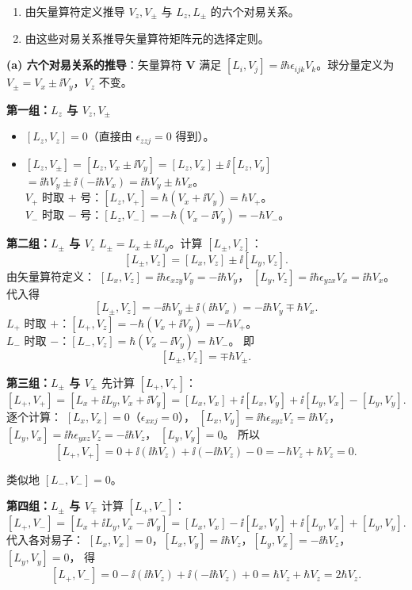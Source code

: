 \begin{question}
\begin{enumerate}
\item 由矢量算符定义推导 $V_z,V_\pm$ 与 $L_z,L_\pm$ 的六个对易关系。
\item 由这些对易关系推导矢量算符矩阵元的选择定则。
\end{enumerate}
\end{question}
\begin{solution}
	\textbf{(a) 六个对易关系的推导}：矢量算符 $\mathbf V$ 满足 $[L_i,V_j]=\ii\hbar\epsilon_{ijk}V_k$。球分量定义为 $V_\pm=V_x\pm\ii V_y$，$V_z$ 不变。

	\textbf{第一组：$L_z$ 与 $V_z,V_\pm$}
	\begin{itemize}
	\item $[L_z,V_z]=0$（直接由 $\epsilon_{zzj}=0$ 得到）。
	\item $[L_z,V_\pm] = [L_z,V_x\pm\ii V_y] = [L_z,V_x]\pm\ii[L_z,V_y]$\\
	$= \ii\hbar V_y \pm\ii(-\ii\hbar V_x) = \ii\hbar V_y\pm\hbar V_x$。\\
	$V_+$ 时取 $+$ 号：$[L_z,V_+]=\hbar(V_x+\ii V_y)=\hbar V_+$。\\
	$V_-$ 时取 $-$ 号：$[L_z,V_-]=-\hbar(V_x-\ii V_y)=-\hbar V_-$。
	\end{itemize}

	\textbf{第二组：$L_\pm$ 与 $V_z$}
	$L_\pm = L_x\pm\ii L_y$。计算 $[L_\pm,V_z]$：
	\[
	[L_\pm,V_z] = [L_x,V_z]\pm\ii[L_y,V_z].
	\]
	由矢量算符定义：
	$[L_x,V_z]=\ii\hbar\epsilon_{xzy}V_y = -\ii\hbar V_y$，
	$[L_y,V_z]=\ii\hbar\epsilon_{yzx}V_x = \ii\hbar V_x$。
	代入得
	\[
	[L_\pm,V_z] = -\ii\hbar V_y \pm\ii(\ii\hbar V_x) = -\ii\hbar V_y \mp\hbar V_x.
	\]
	$L_+$ 时取 $+$：$[L_+,V_z] = -\hbar(V_x+\ii V_y) = -\hbar V_+$。\\
	$L_-$ 时取 $-$：$[L_-,V_z] = \hbar(V_x-\ii V_y) = \hbar V_-$。
	即
	\[
	[L_\pm,V_z] = \mp\hbar V_\pm.
	\]

	\textbf{第三组：$L_\pm$ 与 $V_\pm$} 先计算 $[L_+,V_+]$：
	\[
	[L_+,V_+] = [L_x+\ii L_y, V_x+\ii V_y]
	= [L_x,V_x] + \ii[L_x,V_y] + \ii[L_y,V_x] - [L_y,V_y].
	\]
	逐个计算：
	$[L_x,V_x]=0$（$\epsilon_{xxj}=0$），
	$[L_x,V_y]=\ii\hbar\epsilon_{xyz}V_z = \ii\hbar V_z$，
	$[L_y,V_x]=\ii\hbar\epsilon_{yxz}V_z = -\ii\hbar V_z$，
	$[L_y,V_y]=0$。
	所以
	\[
	[L_+,V_+] = 0 + \ii(\ii\hbar V_z) + \ii(-\ii\hbar V_z) - 0 = -\hbar V_z + \hbar V_z = 0.
	\]

	类似地 $[L_-,V_-]=0$。

	\textbf{第四组：$L_\pm$ 与 $V_\mp$} 计算 $[L_+,V_-]$：
	\[
	[L_+,V_-] = [L_x+\ii L_y, V_x-\ii V_y]
	= [L_x,V_x] -\ii[L_x,V_y] +\ii[L_y,V_x] + [L_y,V_y].
	\]
	代入各对易子：
	$[L_x,V_x]=0$，$[L_x,V_y]=\ii\hbar V_z$，$[L_y,V_x]=-\ii\hbar V_z$，$[L_y,V_y]=0$，
	得
	\[
	[L_+,V_-] = 0 - \ii(\ii\hbar V_z) + \ii(-\ii\hbar V_z) + 0 = \hbar V_z + \hbar V_z = 2\hbar V_z.
	\]


\end{solution}
